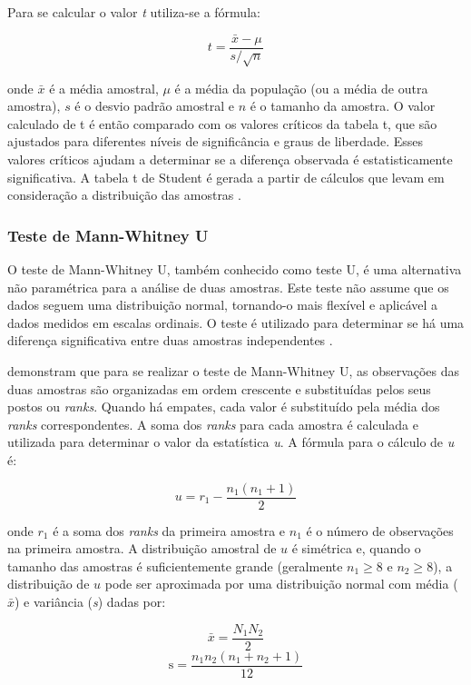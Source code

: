 Para se calcular o valor \textit{t} utiliza-se a fórmula:

\[
t = \frac{\bar{x} - \mu}{s / \sqrt{n}}
\]

onde \(\bar{x}\) é a média amostral, \(\mu\) é a média da população (ou a média de outra amostra), \(s\) é o desvio padrão amostral e \(n\) é o tamanho da amostra. O valor calculado de t é então comparado com os valores críticos da tabela t, que são ajustados para diferentes níveis de significância e graus de liberdade. Esses valores críticos ajudam a determinar se a diferença observada é estatisticamente significativa. A tabela t de Student é gerada a partir de cálculos que levam em consideração a distribuição das amostras \cite{juristo_basics_2001}.




\subsubsection{Teste de Mann-Whitney U}
\label{subsec:u-test}

O teste de Mann-Whitney U, também conhecido como teste U, é uma alternativa não paramétrica para a análise de duas amostras. Este teste não assume que os dados seguem uma distribuição normal, tornando-o mais flexível e aplicável a dados medidos em escalas ordinais. O teste é utilizado para determinar se há uma diferença significativa entre duas amostras independentes \cite{wohlin_experimentation_2012}.

 demonstram que para se realizar o teste de Mann-Whitney U, as observações das duas amostras são organizadas em ordem crescente e substituídas pelos seus postos ou \textit{ranks}. Quando há empates, cada valor é substituído pela média dos \textit{ranks} correspondentes. A soma dos \textit{ranks} para cada amostra é calculada e utilizada para determinar o valor da estatística \textit{u}. A fórmula para o cálculo de \textit{u} é:

\[
u = r_1 - \frac{n_1 (n_1 + 1)}{2}
\]

onde \(r_1\) é a soma dos \textit{ranks} da primeira amostra e \(n_1\) é o número de observações na primeira amostra. A distribuição amostral de \(u\) é simétrica e, quando o tamanho das amostras é suficientemente grande (geralmente \(n_1 \geq 8\) e \(n_2 \geq 8\)), a distribuição de \(u\) pode ser aproximada por uma distribuição normal com média (\(\bar{x}\)) e variância (\textit{s}) dadas por:

\[
\bar{x} = \frac{N_1 N_2}{2}
\]
\[
\text{s} = \frac{n_1 n_2 (n_1 + n_2 + 1)}{12}
\]


